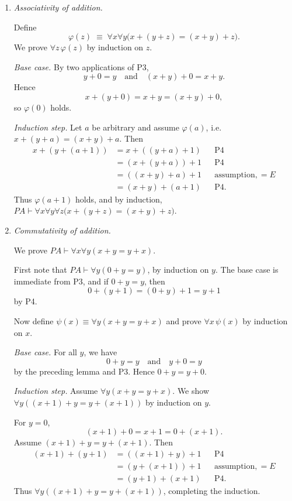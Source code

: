 \documentclass[12pt,fleqn]{article}
\begin{document}
\begin{enumerate}

\item \emph{Associativity of addition.}

Define
\[
\varphi(z)\;\equiv\;\forall x\forall y\bigl(x+(y+z)=(x+y)+z\bigr).
\]
We prove $\forall z\,\varphi(z)$ by induction on $z$.

\emph{Base case.} By two applications of P3,
\[
y+0=y \quad\text{and}\quad (x+y)+0=x+y.
\]
Hence
\[
x+(y+0)=x+y=(x+y)+0,
\]
so $\varphi(0)$ holds.

\emph{Induction step.} Let $a$ be arbitrary and assume $\varphi(a)$, i.e.
$x+(y+a)=(x+y)+a$. Then
\[
\begin{aligned}
x+(y+(a+1)) &= x+((y+a)+1) && \text{P4} \\
            &= (x+(y+a))+1 && \text{P4} \\
            &= ((x+y)+a)+1 && \text{assumption}, =E \\
            &= (x+y)+(a+1) && \text{P4}.
\end{aligned}
\]
Thus $\varphi(a+1)$ holds, and by induction,
$PA\vdash\forall x\forall y\forall z\bigl(x+(y+z)=(x+y)+z\bigr)$.

\item \emph{Commutativity of addition.}

We prove $PA\vdash\forall x\forall y(x+y=y+x)$.

First note that $PA\vdash\forall y(0+y=y)$, by induction on $y$.
The base case is immediate from P3, and if $0+y=y$, then
\[
0+(y+1)=(0+y)+1=y+1
\]
by P4.

Now define $\psi(x)\equiv\forall y(x+y=y+x)$ and prove $\forall x\,\psi(x)$
by induction on $x$.

\emph{Base case.} For all $y$, we have
\[
0+y=y \quad\text{and}\quad y+0=y
\]
by the preceding lemma and P3. Hence $0+y=y+0$.

\emph{Induction step.} Assume $\forall y(x+y=y+x)$. We show
$\forall y((x+1)+y=y+(x+1))$ by induction on $y$.

For $y=0$,
\[
(x+1)+0=x+1=0+(x+1).
\]
Assume $(x+1)+y=y+(x+1)$. Then
\[
\begin{aligned}
(x+1)+(y+1) &= ((x+1)+y)+1 && \text{P4} \\
            &= (y+(x+1))+1 && \text{assumption}, =E \\
            &= (y+1)+(x+1) && \text{P4}.
\end{aligned}
\]
Thus $\forall y((x+1)+y=y+(x+1))$, completing the induction.


\end{enumerate}
\end{document}
